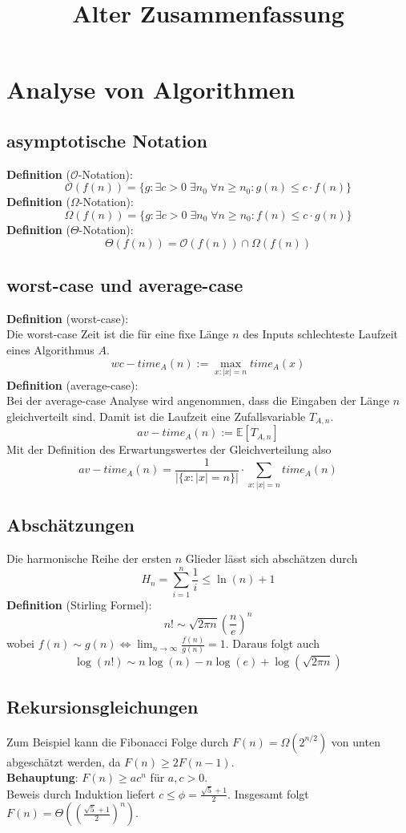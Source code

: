 \documentclass[a4paper, 12pt]{article}
\begin{document}
	\begin{titlepage} 
		\title{Alter Zusammenfassung}
		\clearpage\maketitle
		\thispagestyle{empty}
	\end{titlepage}
	\tableofcontents
	\section{Analyse von Algorithmen}
	\subsection{asymptotische Notation}
	\textbf{Definition} ($\mathcal{O}$-Notation):
	\[\mathcal{O}(f(n)) = \{g: \exists c>0\; \exists n_0 \; \forall n\geq n_0: g(n) \leq c\cdot f(n)\}\]
	\textbf{Definition} ($\Omega$-Notation):
	\[\Omega(f(n)) = \{g: \exists c>0\; \exists n_0 \; \forall n\geq n_0: f(n) \leq c\cdot g(n)\}\]
	\textbf{Definition} ($\Theta$-Notation): \[\Theta(f(n)) = \mathcal{O}(f(n)) \cap \Omega(f(n))\]

	\subsection{worst-case und average-case}
	\textbf{Definition} (worst-case):\\
	Die worst-case Zeit ist die für eine fixe Länge $n$ des Inputs schlechteste Laufzeit eines Algorithmus $A$. \[wc-time_A(n) := \max_{x: \left|x\right| = n} time_A(x)\]
	\textbf{Definition} (average-case):\\
	Bei der average-case Analyse wird angenommen, dass die Eingaben der Länge $n$ gleichverteilt sind. Damit ist die Laufzeit eine Zufallsvariable $T_{A,n}$. \[av-time_{A}(n) := \mathbb{E}[T_{A,n}]\] Mit der Definition des Erwartungswertes der Gleichverteilung also \[av-time_A(n) = \frac{1}{\left|\{x: \left|x\right| = n\}\right|} \cdot \sum_{x: \left|x\right| = n} time_A(n)\]
	\subsection{Abschätzungen}
	Die harmonische Reihe der ersten $n$ Glieder lässt sich abschätzen durch \[H_n = \sum_{i=1}^{n} \frac{1}{i} \leq \ln(n)+1\]
	\textbf{Definition} (Stirling Formel):
	\[n! \sim \sqrt{2\pi n} (\frac{n}{e})^n\]
	wobei $f(n) \sim g(n) \Leftrightarrow \lim_{n\to\infty} \frac{f(n)}{g(n)} = 1$. Daraus folgt auch \[\log(n!) \sim n\log(n) - n\log(e) + \log(\sqrt{2\pi n})\]
	\subsection{Rekursionsgleichungen}
	Zum Beispiel kann die Fibonacci Folge durch $F(n) = \Omega(2^{n/2})$ von unten abgeschätzt werden, da $F(n) \geq 2F(n-1)$.\\
	\textbf{Behauptung}: $F(n) \geq ac^n$ für $a,c >0$.\\ Beweis durch Induktion liefert $c \leq \phi = \frac{\sqrt{5}+1}{2}$. Insgesamt folgt $F(n) = \Theta((\frac{\sqrt{5}+1}{2})^n)$.
\end{document}
